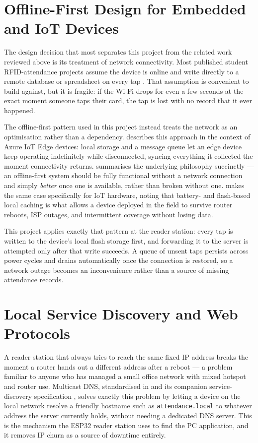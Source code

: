 \section{Offline-First Design for Embedded and IoT Devices}

The design decision that most separates this project from the related work reviewed above is its treatment of network connectivity. Most published student RFID-attendance projects assume the device is online and write directly to a remote database or spreadsheet on every tap \parencite{yadav2025rfid, hutabarat2025implementation}. That assumption is convenient to build against, but it is fragile: if the Wi-Fi drops for even a few seconds at the exact moment someone taps their card, the tap is lost with no record that it ever happened.

The offline-first pattern used in this project instead treats the network as an optimisation rather than a dependency. \textcite{microsoft2026offline} describes this approach in the context of Azure IoT Edge devices: local storage and a message queue let an edge device keep operating indefinitely while disconnected, syncing everything it collected the moment connectivity returns. \textcite{topic2026offline} summarises the underlying philosophy succinctly — an offline-first system should be fully functional without a network connection and simply \textit{better} once one is available, rather than broken without one. \textcite{metadesk2026offline} makes the same case specifically for IoT hardware, noting that battery- and flash-based local caching is what allows a device deployed in the field to survive router reboots, ISP outages, and intermittent coverage without losing data.

This project applies exactly that pattern at the reader station: every tap is written to the device's local flash storage first, and forwarding it to the server is attempted only after that write succeeds. A queue of unsent taps persists across power cycles and drains automatically once the connection is restored, so a network outage becomes an inconvenience rather than a source of missing attendance records.

\section{Local Service Discovery and Web Protocols}

A reader station that always tries to reach the same fixed IP address breaks the moment a router hands out a different address after a reboot — a problem familiar to anyone who has managed a small office network with mixed hotspot and router use. Multicast DNS, standardised in \textcite{cheshire2013mdns} and its companion service-discovery specification \parencite{cheshire2013dnssd}, solves exactly this problem by letting a device on the local network resolve a friendly hostname such as \texttt{attendance.local} to whatever address the server currently holds, without needing a dedicated DNS server. This is the mechanism the ESP32 reader station uses to find the PC application, and it removes IP churn as a source of downtime entirely.

